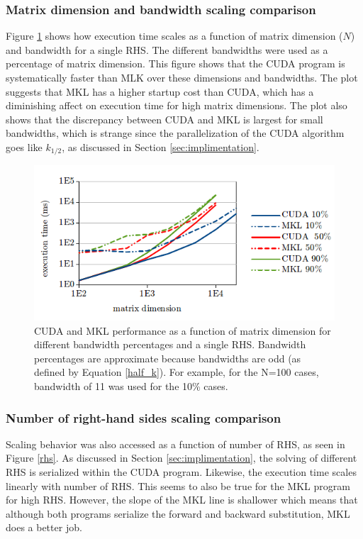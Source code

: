 \documentclass[12pt]{article}
\begin{document}
\subsubsection{Matrix dimension and bandwidth scaling comparison}

Figure \ref{scaling} shows how execution time scales as a function of matrix
dimension ($N$) and bandwidth for a single RHS. The different bandwidths were
used as a percentage of matrix dimension. This figure shows that the CUDA
program is systematically faster than MLK over these dimensions and bandwidths.
The plot suggests that MKL has a higher startup cost than CUDA, which has a
diminishing affect on execution time for high matrix dimensions. The plot also
shows that the discrepancy between CUDA and MKL is largest for small
bandwidths, which is strange since the parallelization of the CUDA algorithm
goes like $k_{1/2}$, as discussed in Section \ref{sec:implimentation}.

\begin{figure}[H]
\caption{CUDA and MKL performance as a function of matrix dimension for different bandwidth percentages and a single RHS. Bandwidth percentages are approximate because bandwidths are odd (as defined by Equation \ref{half_k}). For example, for the N=100 cases, bandwidth of 11 was used for the 10\% cases.}
\label{scaling}
\centerline{\includegraphics[width=12cm]{full_scaling.png}}
\end{figure}

\subsubsection{Number of right-hand sides scaling comparison}
\label{sec:rhs}

Scaling behavior was also accessed as a function of number of RHS, as seen in
Figure \ref{rhs}. As discussed in Section \ref{sec:implimentation}, the
solving of different RHS is serialized within the CUDA program.
Likewise, the execution time scales linearly with number of RHS. This seems to
also be true for the MKL program for high RHS. However, the slope of the MKL
line is shallower which means that although both programs serialize the forward
and backward substitution, MKL does a better job.
\end{document}
